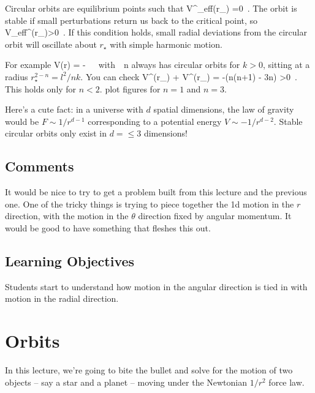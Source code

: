 \para
{\co Circular orbits are equilibrium points such that
%
\be V^\prime_{\rm eff}(r_\star) =0\ .\label{centralcritical}\ee
%
The orbit is stable if small perturbations return us back to the critical point, so
%
\be V_{\rm eff}^{\prime\prime}(r_\star)>0\ .\ee
%
}
If this condition holds, small radial deviations from the circular orbit will oscillate about $r_\star$ with simple harmonic motion. 

\para
{\co For example
%
\be V(r) = -\  \ \ {\rm with}\ \  n\ee
%
always has circular orbits for  $k>0$, sitting at a radius $r_\star^{2-n} = l^2/nk$. You can check
%
\be V^{\prime\prime}(r_\star) +  V^\prime(r_\star) = -\Big(n(n+1) - 3n\Big) >0\ .\ee
%
This holds only for $n<2$. {\cblue plot figures for $n=1$ and $n=3$.}




\para
Here's a cute fact: in a universe with $d$ spatial dimensions, the law of gravity would be $F\sim 1/r^{d-1}$ corresponding to a potential energy $V\sim -1/r^{d-2}$. Stable circular orbits only exist in $d=\leq 3$ dimensions!}

\subsection*{Comments}

{\cblue It would be nice to try to get a problem built from this lecture and the previous one. One of the tricky things is trying to piece together the 1d motion in the $r$ direction, with the motion in the $\theta$ direction fixed by angular momentum. It would be good to have something that fleshes this out.}

\subsection{Learning Objectives}

Students start to understand how motion in the angular direction is tied in with motion in the radial direction. 




\newpage
\section{Orbits}

In this lecture, we're going to bite the bullet and solve for the motion of two objects -- say a star and a planet -- moving under the Newtonian $1/r^2$ force law. 


